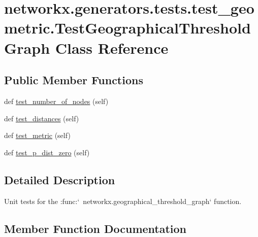 \hypertarget{classnetworkx_1_1generators_1_1tests_1_1test__geometric_1_1TestGeographicalThresholdGraph}{}\section{networkx.\+generators.\+tests.\+test\+\_\+geometric.\+Test\+Geographical\+Threshold\+Graph Class Reference}
\label{classnetworkx_1_1generators_1_1tests_1_1test__geometric_1_1TestGeographicalThresholdGraph}
\subsection*{Public Member Functions}
\begin{DoxyCompactItemize}
\item 
def \hyperlink{classnetworkx_1_1generators_1_1tests_1_1test__geometric_1_1TestGeographicalThresholdGraph_a69c60035c279acc4781f0d7b3e8c025a}{test\+\_\+number\+\_\+of\+\_\+nodes} (self)
\item 
def \hyperlink{classnetworkx_1_1generators_1_1tests_1_1test__geometric_1_1TestGeographicalThresholdGraph_ad62aad1b3e12ec9dac96dc48752d5c50}{test\+\_\+distances} (self)
\item 
def \hyperlink{classnetworkx_1_1generators_1_1tests_1_1test__geometric_1_1TestGeographicalThresholdGraph_a49b5034d93432a574d6db8b18865ed8c}{test\+\_\+metric} (self)
\item 
def \hyperlink{classnetworkx_1_1generators_1_1tests_1_1test__geometric_1_1TestGeographicalThresholdGraph_a4821fb233d568c66e017e9ad4626ab91}{test\+\_\+p\+\_\+dist\+\_\+zero} (self)
\end{DoxyCompactItemize}


\subsection{Detailed Description}
\begin{DoxyVerb}Unit tests for the :func:`~networkx.geographical_threshold_graph`
function.\end{DoxyVerb}
 

\subsection{Member Function Documentation}
\mbox{\label{classnetworkx_1_1generators_1_1tests_1_1test__geometric_1_1TestGeographicalThresholdGraph_ad62aad1b3e12ec9dac96dc48752d5c50}} 
